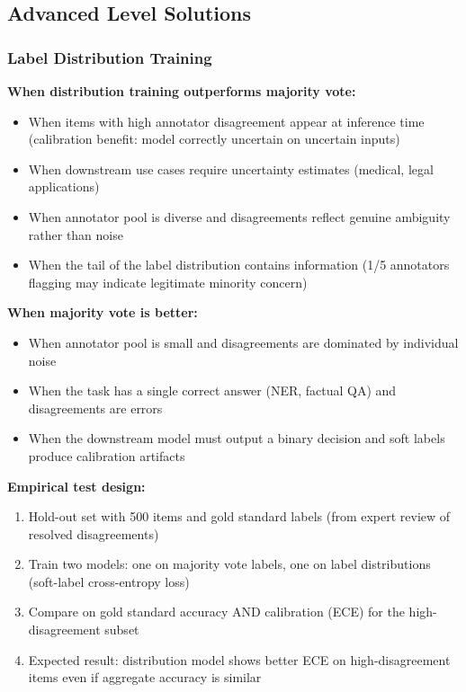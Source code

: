 \subsection{Advanced Level Solutions}

\subsubsection{Label Distribution Training}

\textbf{When distribution training outperforms majority vote:}
\begin{itemize}
    \item When items with high annotator disagreement appear at inference time (calibration benefit: model correctly uncertain on uncertain inputs)
    \item When downstream use cases require uncertainty estimates (medical, legal applications)
    \item When annotator pool is diverse and disagreements reflect genuine ambiguity rather than noise
    \item When the tail of the label distribution contains information (1/5 annotators flagging may indicate legitimate minority concern)
\end{itemize}

\textbf{When majority vote is better:}
\begin{itemize}
    \item When annotator pool is small and disagreements are dominated by individual noise
    \item When the task has a single correct answer (NER, factual QA) and disagreements are errors
    \item When the downstream model must output a binary decision and soft labels produce calibration artifacts
\end{itemize}

\textbf{Empirical test design:}
\begin{enumerate}
    \item Hold-out set with 500 items and gold standard labels (from expert review of resolved disagreements)
    \item Train two models: one on majority vote labels, one on label distributions (soft-label cross-entropy loss)
    \item Compare on gold standard accuracy AND calibration (ECE) for the high-disagreement subset
    \item Expected result: distribution model shows better ECE on high-disagreement items even if aggregate accuracy is similar
\end{enumerate}

